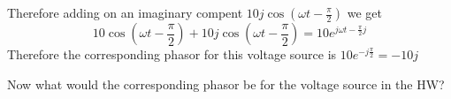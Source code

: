 \documentclass[12pt]{article}
\begin{document}
Therefore adding on an imaginary compent $10j\cos(\omega t-\frac{\pi}{2})$ we get
$$10\cos(\omega t-\frac{\pi}{2})+10j\cos(\omega t-\frac{\pi}{2})=10e^{j\omega t-\frac{\pi}{2}j}$$
Therefore the corresponding phasor for this voltage source is $10e^{-j\frac{\pi}{2}}=-10j$

Now what would the corresponding phasor be for the voltage source in the HW?
\end{document}
